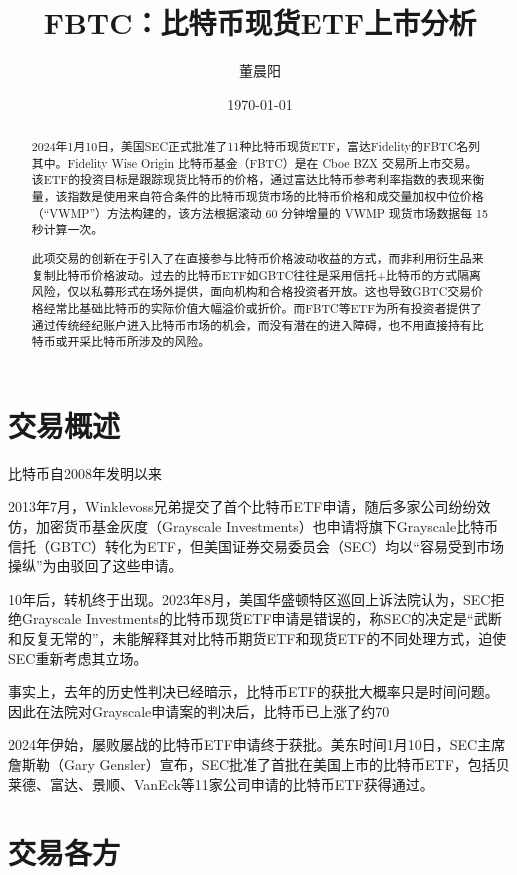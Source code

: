 \documentclass[a4paper,12pt]{ctexart}
\title{FBTC：比特币现货ETF上市分析}
\author{董晨阳}
\date{\today}
\begin{document}
\maketitle
\begin{abstract}

    2024年1月10日，美国SEC正式批准了11种比特币现货ETF，富达Fidelity的FBTC名列其中。Fidelity Wise Origin 比特币基金（FBTC）是在 Cboe BZX 交易所上市交易。该ETF的投资目标是跟踪现货比特币的价格，通过富达比特币参考利率指数的表现来衡量，该指数是使用来自符合条件的比特币现货市场的比特币价格和成交量加权中位价格（“VWMP”）方法构建的，该方法根据滚动 60 分钟增量的 VWMP 现货市场数据每 15 秒计算一次。

    此项交易的创新在于引入了在直接参与比特币价格波动收益的方式，而非利用衍生品来复制比特币价格波动。过去的比特币ETF如GBTC往往是采用信托+比特币的方式隔离风险，仅以私募形式在场外提供，面向机构和合格投资者开放。这也导致GBTC交易价格经常比基础比特币的实际价值大幅溢价或折价。而FBTC等ETF为所有投资者提供了通过传统经纪账户进入比特币市场的机会，而没有潜在的进入障碍，也不用直接持有比特币或开采比特币所涉及的风险。

\end{abstract}
\section{交易概述}
比特币\citep{nakamoto2008bitcoin}自2008年发明以来

2013年7月，Winklevoss兄弟提交了首个比特币ETF申请，随后多家公司纷纷效仿，加密货币基金灰度（Grayscale Investments）也申请将旗下Grayscale比特币信托（GBTC）转化为ETF，但美国证券交易委员会（SEC）均以“容易受到市场操纵”为由驳回了这些申请。

10年后，转机终于出现。2023年8月，美国华盛顿特区巡回上诉法院认为，SEC拒绝Grayscale Investments的比特币现货ETF申请是错误的，称SEC的决定是“武断和反复无常的”，未能解释其对比特币期货ETF和现货ETF的不同处理方式，迫使SEC重新考虑其立场。

事实上，去年的历史性判决已经暗示，比特币ETF的获批大概率只是时间问题。因此在法院对Grayscale申请案的判决后，比特币已上涨了约70%

2024年伊始，屡败屡战的比特币ETF申请终于获批。美东时间1月10日，SEC主席詹斯勒（Gary Gensler）宣布，SEC批准了首批在美国上市的比特币ETF，包括贝莱德、富达、景顺、VanEck等11家公司申请的比特币ETF获得通过。
\section{交易各方}
\end{document}
